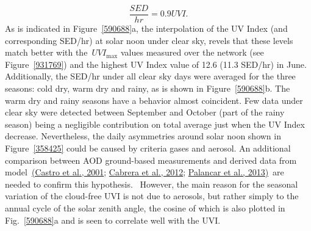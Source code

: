 \documentclass[10pt]{article}
\begin{document}
\begin{equation}
  \frac{SED}{hr}=0.9UVI.  
\end{equation}
As is indicated in
Figure~{\ref{590688}}a, the interpolation of the UV
Index (and corresponding SED/hr) at solar noon under clear sky, revels
that these levels match better with the~\(UVI_{\max}\) values
measured over the network (see Figure~{\ref{931769}})
and the highest UV Index value of 12.6 (11.3 SED/hr) in June.
Additionally, the SED/hr under all clear sky days were averaged for the
three seasons: cold dry, warm dry and rainy, as is shown in
Figure~{\ref{590688}}b. The warm dry and rainy seasons
have a behavior almost coincident. Few data under clear sky were
detected between September and October (part of the rainy season) being
a negligible contribution on total average just when the UV Index
decrease. Nevertheless, the daily asymmetries around solar noon shown in
Figure~{\ref{358425}} could be caused by criteria gases
and aerosol. An additional comparison between AOD ground-based
measurements and derived data from model~\hyperref[csl:14]{(Castro et al., 2001}; \hyperref[csl:69]{Cabrera et al., 2012}; \hyperref[csl:13]{Palancar et al., 2013)}~are needed
to confirm this hypothesis.~ However, the main reason for the seasonal
variation of the cloud-free UVI is not due to aerosols, but rather
simply to the annual cycle of the solar zenith angle, the cosine of
which is also plotted in Fig.~{\ref{590688}}a and is
seen to correlate well with the UVI. ~
\end{document}

